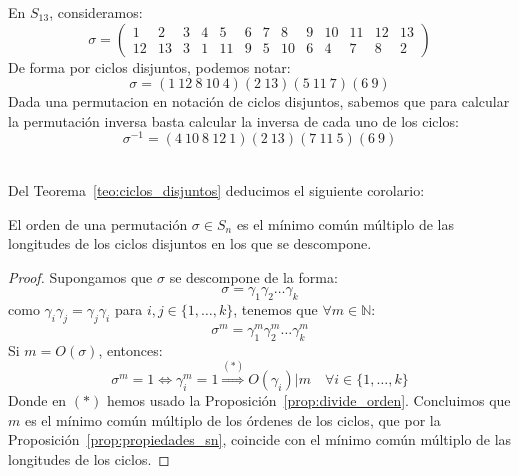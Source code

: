 \begin{ejemplo}
    En $S_{13}$, consideramos:
    \begin{equation*}
        \sigma = \left(\begin{array}{ccccccccccccc}
                1 & 2 & 3 & 4 & 5 & 6 & 7 & 8 & 9 & 10 & 11 & 12 & 13 \\
                12 & 13 & 3 & 1 & 11 & 9 & 5 & 10 & 6 & 4 & 7 & 8 & 2
        \end{array}\right)
    \end{equation*}
    De forma por ciclos disjuntos, podemos notar:
    \begin{equation*}
        \sigma = (1\ 12\ 8\ 10\ 4)(2\ 13)(5\ 11\ 7)(6\ 9)
    \end{equation*}
    Dada una permutacion en notación de ciclos disjuntos, sabemos que para calcular la permutación inversa basta calcular la inversa de cada uno de los ciclos:
    \begin{equation*}
        \sigma^{-1} = (4\ 10\ 8\ 12\ 1)(2\ 13)(7\ 11\ 5)(6\ 9)
    \end{equation*}
\end{ejemplo}~\\

Del Teorema~\ref{teo:ciclos_disjuntos} deducimos el siguiente corolario:
\begin{coro}\label{cor:orden_permutacion}
    El orden de una permutación $\sigma\in S_n$ es el mínimo común múltiplo de las longitudes de los ciclos disjuntos en los que se descompone.
    \begin{proof}
        Supongamos que $\sigma$ se descompone de la forma:
        \begin{equation*}
            \sigma = \gamma_1\gamma_2\ldots \gamma_k
        \end{equation*}
        como $\gamma_i \gamma_j = \gamma_j \gamma_i$ para $i,j\in \{1,\ldots,k\}$, tenemos que $\forall m\in \mathbb{N}$:
        \begin{equation*}
            \sigma^m = \gamma_1^m \gamma_2^m \ldots \gamma_k^m
        \end{equation*}
        Si $m = O(\sigma)$, entonces:
        \begin{equation*}
            \sigma^m = 1 \Longleftrightarrow \gamma_i^m = 1 \stackrel{(\ast)}{\Longrightarrow} O(\gamma_i) | m \quad \forall i \in \{1,\ldots,k\}
        \end{equation*}
        Donde en $(\ast)$ hemos usado la Proposición~\ref{prop:divide_orden}. Concluimos que $m$ es el mínimo común múltiplo de los órdenes de los ciclos, que por la Proposición~\ref{prop:propiedades_sn}, coincide con el mínimo común múltiplo de las longitudes de los ciclos.
    \end{proof}
\end{coro}

